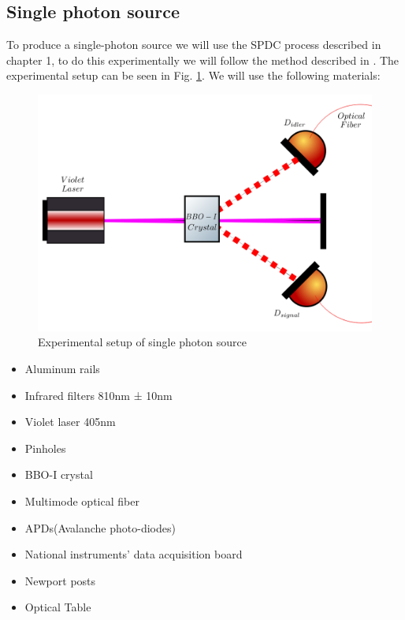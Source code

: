 \documentclass[12pt]{article}
\begin{document}
\subsection{Single photon source}

To produce a single-photon source we will use the SPDC process described in chapter 1, to do this experimentally we will follow the method described in \cite{maestria_procopio}. The experimental setup can be seen in Fig. \ref{single}.  We will use the following materials:

\begin{figure}[!htb]
\centering
\includegraphics[width=\linewidth]{images/SPDC_exp.png}
\caption{Experimental setup of single photon source}
\label{single}
\end{figure}



\begin{itemize}

\item Aluminum rails
\item Infrared filters 810nm ± 10nm
\item Violet laser 405nm
\item Pinholes
\item BBO-I crystal
\item Multimode optical fiber
\item APDs(Avalanche photo-diodes)
\item National instruments' data acquisition board 
\item Newport posts
\item Optical Table

\end{itemize}
\end{document}
